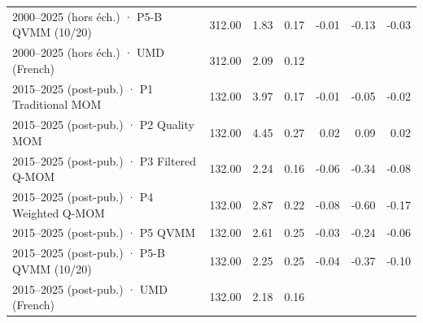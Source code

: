 \begin{table}[htbp]
\begin{tabular}{lrrrrrr}
2000–2025 (hors éch.) · P5-B QVMM (10/20) & 312.00 & 1.83 & 0.17 & -0.01 & -0.13 & -0.03 \\
2000–2025 (hors éch.) · UMD (French) & 312.00 & 2.09 & 0.12 &  &  &  \\
2015–2025 (post-pub.) · P1 Traditional MOM & 132.00 & 3.97 & 0.17 & -0.01 & -0.05 & -0.02 \\
2015–2025 (post-pub.) · P2 Quality MOM & 132.00 & 4.45 & 0.27 & 0.02 & 0.09 & 0.02 \\
2015–2025 (post-pub.) · P3 Filtered Q-MOM & 132.00 & 2.24 & 0.16 & -0.06 & -0.34 & -0.08 \\
2015–2025 (post-pub.) · P4 Weighted Q-MOM & 132.00 & 2.87 & 0.22 & -0.08 & -0.60 & -0.17 \\
2015–2025 (post-pub.) · P5 QVMM & 132.00 & 2.61 & 0.25 & -0.03 & -0.24 & -0.06 \\
2015–2025 (post-pub.) · P5-B QVMM (10/20) & 132.00 & 2.25 & 0.25 & -0.04 & -0.37 & -0.10 \\
2015–2025 (post-pub.) · UMD (French) & 132.00 & 2.18 & 0.16 &  &  &  \\
\bottomrule
\end{tabular}
\end{table}
